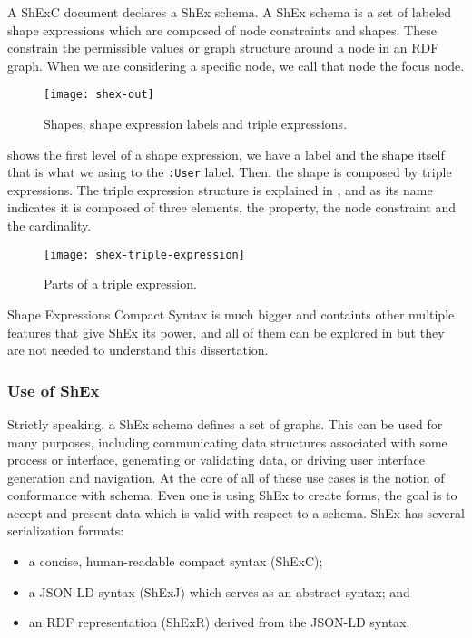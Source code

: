 A ShExC document declares a ShEx schema. A ShEx schema is a set of labeled shape expressions which are composed of node constraints and shapes. These constrain the permissible values or graph structure around a node in an RDF graph. When we are considering a specific node, we call that node the focus node.

\begin{figure}[hb]
  \texttt{[image: shex-out]}
  \caption[Shapes, shape expression labels and triple expressions]{Shapes, shape expression labels and triple expressions.}
\end{figure}

 shows the first level of a shape expression, we have a label and the shape itself that is what we asing to the \texttt{:User} label. Then, the shape is composed by triple expressions. The triple expression structure is explained in , and as its name indicates it is composed of three elements, the property, the node constraint and the cardinality.

\begin{figure}[hb]
  \texttt{[image: shex-triple-expression]}
  \caption[Parts of a triple expression]{Parts of a triple expression.}
\end{figure}

Shape Expressions Compact Syntax is much bigger and containts other multiple features that give ShEx its power, and all of them can be explored in  but they are not needed to understand this dissertation.

\subsubsection{Use of ShEx}
Strictly speaking, a ShEx schema defines a set of graphs. This can be used for many purposes, including communicating data structures associated with some process or interface, generating or validating data, or driving user interface generation and navigation. At the core of all of these use cases is the notion of conformance with schema. Even one is using ShEx to create forms, the goal is to accept and present data which is valid with respect to a schema.
ShEx has several serialization formats:

\begin{itemize}
	\item a concise, human-readable compact syntax (ShExC);
	\item a JSON-LD syntax (ShExJ) which serves as an abstract syntax; and
	\item an RDF representation (ShExR) derived from the JSON-LD syntax.
\end{itemize}

